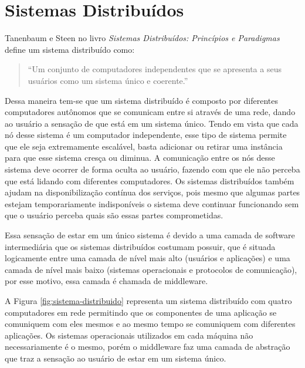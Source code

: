 \section{Sistemas Distribuídos}

    Tanenbaum e Steen no livro \textit{Sistemas Distribuídos: Princípios e Paradigmas} define um sistema distribuído como: %

    \begin{quote}
        ``Um conjunto de computadores independentes que se apresenta a seus usuários como um sistema único e coerente.''
     \end{quote}

    Dessa maneira tem-se que um sistema distribuído é composto por diferentes computadores autônomos que se comunicam entre si através de uma rede, dando ao usuário a sensação de que está em um sistema único. Tendo em vista que cada nó desse sistema é um computador independente, esse tipo de sistema permite que ele seja extremamente escalável, basta adicionar ou retirar uma instância para que esse sistema cresça ou diminua. A comunicação entre os nós desse sistema deve ocorrer de forma oculta ao usuário, fazendo com que ele não perceba que está lidando com diferentes computadores. Os sistemas distribuídos também ajudam na disponibilização contínua dos serviços, pois mesmo que algumas partes estejam temporariamente indisponíveis o sistema deve continuar funcionando sem que o usuário perceba quais são essas partes comprometidas.

    Essa sensação de estar em um único sistema é devido a uma camada de software intermediária que os sistemas distribuídos costumam possuir, que é situada logicamente entre uma camada de nível mais alto (usuários e aplicações) e uma camada de nível mais baixo (sistemas operacionais e protocolos de comunicação), por esse motivo, essa camada é chamada de middleware.

    A Figura \ref{fig:sistema-distribuido} representa um sistema distribuído com quatro computadores em rede permitindo que os componentes de uma aplicação se comuniquem com eles mesmos e ao mesmo tempo se comuniquem com diferentes aplicações. Os sistemas operacionais utilizados em cada máquina não necessariamente é o mesmo, porém o middleware faz uma camada de abstração que traz a sensação ao usuário de estar em um sistema único.
            
